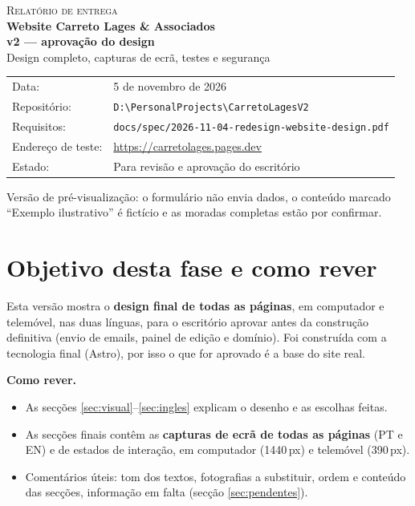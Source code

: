 \documentclass[11pt,a4paper]{article}
\begin{document}
\begin{titlepage}
  \vspace*{3cm}
  {\color{bronze}\small\scshape Relatório de entrega}\\[0.6em]
  {\Huge\bfseries\color{verde700} Website Carreto Lages \& Associados\\[0.2em] v2 --- aprovação do design}\\[1.2em]
  {\large Design completo, capturas de ecrã, testes e segurança}\\[3em]
  \begin{tabular}{@{}ll}
    Data: & 5 de novembro de 2026 \\
    Repositório: & \texttt{D:\textbackslash PersonalProjects\textbackslash CarretoLagesV2} \\
    Requisitos: & \texttt{docs/spec/2026-11-04-redesign-website-design.pdf} \\
    Endereço de teste: & \url{https://carretolages.pages.dev} \\
    Estado: & Para revisão e aprovação do escritório \\
  \end{tabular}
  \vfill
  {\small\color{tintasuave} Versão de pré-visualização: o formulário não envia dados, o conteúdo marcado
  ``Exemplo ilustrativo'' é fictício e as moradas completas estão por confirmar.}
\end{titlepage}

\tableofcontents
\clearpage

\section{Objetivo desta fase e como rever}

Esta versão mostra o \textbf{design final de todas as páginas}, em computador e telemóvel, nas duas
línguas, para o escritório aprovar antes da construção definitiva (envio de emails, painel de edição e
domínio). Foi construída com a tecnologia final (Astro), por isso o que for aprovado é a base do site real.

\textbf{Como rever.}
\begin{itemize}
  \item As secções \ref{sec:visual}--\ref{sec:ingles} explicam o desenho e as escolhas feitas.
  \item As secções finais contêm as \textbf{capturas de ecrã de todas as \resPages{} páginas} (PT e EN) e de \resStates{} estados de interação, em computador (1440\,px) e telemóvel (390\,px).
  \item Comentários úteis: tom dos textos, fotografias a substituir, ordem e conteúdo das secções, informação em falta (secção \ref{sec:pendentes}).
\end{itemize}
\end{document}
